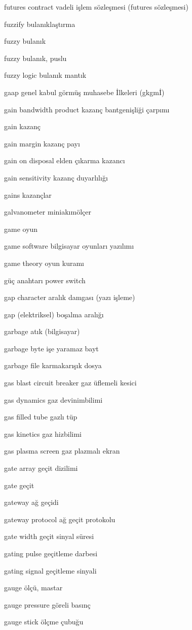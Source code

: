 \documentclass[12pt,fleqn]{article}\usepackage{../../common}
\begin{document}
futures contract vadeli işlem sözleşmesi (futures sözleşmesi)

fuzzify bulanıklaştırma

fuzzy bulanık

fuzzy bulanık, puslu

fuzzy logic bulanık mantık

gaap genel kabul görmüş muhasebe İlkeleri (gkgmİ)

gain bandwidth product kazanç bantgenişliği çarpımı

gain kazanç

gain margin kazanç payı

gain on disposal elden çıkarma kazancı

gain sensitivity kazanç duyarlılığı

gains kazançlar

galvanometer miniakımölçer

game oyun

game software bilgisayar oyunları yazılımı

game theory oyun kuramı

güç anahtarı power switch

gap character aralık damgası (yazı işleme)

gap (elektriksel) boşalma aralığı

garbage atık (bilgisayar)

garbage byte işe yaramaz bayt

garbage file karmakarışık dosya

gas blast circuit breaker gaz üflemeli kesici

gas dynamics gaz devinimbilimi

gas filled tube gazlı tüp

gas kinetics gaz hizbilimi

gas plasma screen gaz plazmalı ekran

gate array geçit dizilimi

gate geçit

gateway ağ geçidi

gateway protocol ağ geçit protokolu

gate width geçit sinyal süresi

gating pulse geçitleme darbesi

gating signal geçitleme sinyali

gauge ölçü, mastar

gauge pressure göreli basınç

gauge stick ölçme çubuğu
\end{document}
